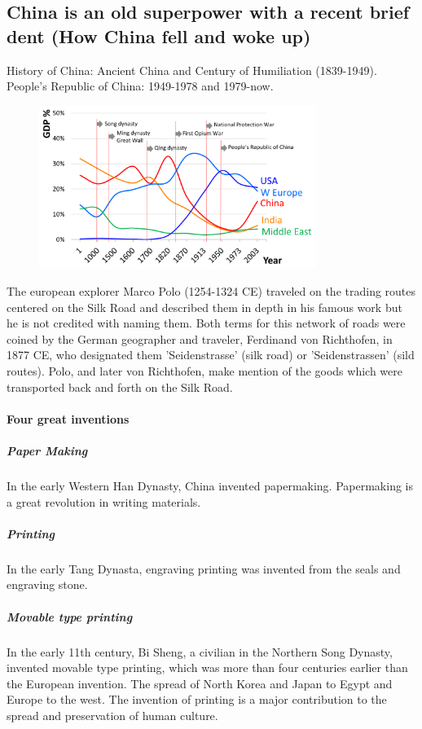 \subsection{China is an old superpower with a recent brief dent (How China fell
and woke up)}

History of China: Ancient China and Century of Humiliation (1839-1949).
People's Republic of China: 1949-1978 and 1979-now.

\begin{figure}[H]
    \centering
    \includegraphics[width=0.8\textwidth]{Pictures/GDP_time_china.png}
\end{figure}

The european explorer Marco Polo (1254-1324 CE) traveled on the trading routes
centered on the Silk Road and described them in depth in his famous work but
he is not credited with naming them. Both terms for this network of roads were
coined by the German geographer and traveler, Ferdinand von Richthofen, in
1877 CE, who designated them 'Seidenstrasse' (silk road) or 'Seidenstrassen'
(sild routes). Polo, and later von Richthofen, make mention of the goods which
were transported back and forth on the Silk Road.

\paragraph{Four great inventions}

\subparagraph{Paper Making}
In the early Western Han Dynasty, China invented papermaking.
Papermaking is a great revolution in writing materials.

\subparagraph{Printing}
In the early Tang Dynasta, engraving printing was invented from the
seals and engraving stone.

\subparagraph{Movable type printing}
In the early 11th century, Bi Sheng, a civilian in the Northern Song Dynasty,
invented movable type printing, which was more than four centuries earlier
than the European invention. The spread of North Korea and Japan to Egypt and
Europe to the west. The invention of printing is a major contribution to the
spread and preservation of human culture.

